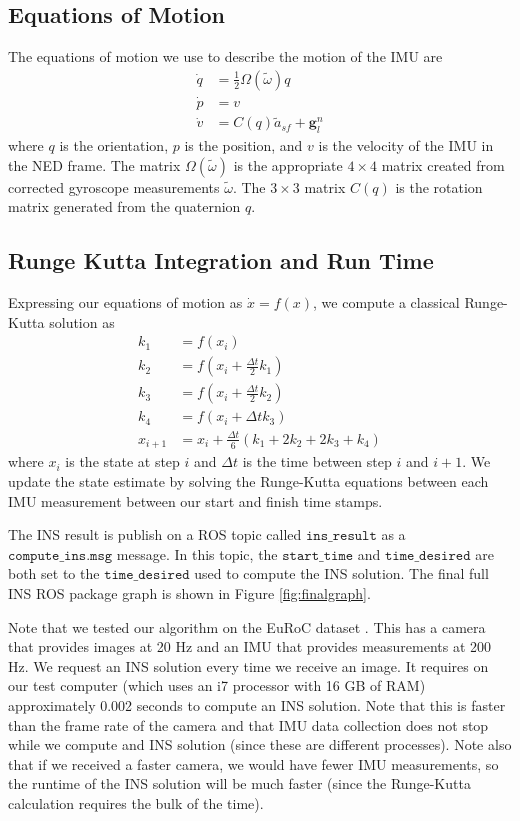 \documentclass[11pt,a4paper]{article}
\begin{document}
\subsection{Equations of Motion}
The equations of motion we use to describe the motion of the IMU are
\begin{align}
	\dot{q} & = \frac{1}{2}\Omega(\tilde{\omega}) q \\
	\dot{p} & = v \\
	\dot{v} & = C(q)\tilde{a}_{sf} + \mathbf{g}^n_l
\end{align}
where $q$ is the orientation, $p$ is the position, and $v$ is the velocity of the IMU in the NED frame. The matrix $\Omega(\tilde{\omega})$ is the appropriate $4\times 4$ matrix created from corrected gyroscope measurements $\tilde{\omega}$. The $3 \times 3$ matrix $C(q)$ is the rotation matrix generated from the quaternion $q$.

\subsection{Runge Kutta Integration and Run Time}
Expressing our equations of motion as $\dot{x} = f(x)$, we compute a classical Runge-Kutta solution as
\begin{align}
	k_1 & = f(x_i) \\
	k_2 & = f(x_i + \frac{\Delta t}{2}k_1) \\
	k_3 & = f(x_i + \frac{\Delta t}{2}k_2) \\
	k_4 & = f(x_i + \Delta t k_3) \\
	x_{i+1} & = x_i + \frac{\Delta t}{6}\left(k_1 + 2 k_2 + 2 k_3 + k_4\right) 
\end{align}
where $x_i$ is the state at step $i$ and $\Delta t$ is the time between step $i$ and $i+1$. We update the state estimate by solving the Runge-Kutta equations between each IMU measurement between our start and finish time stamps.

The INS result is publish on a ROS topic called $\texttt{ins\_result}$ as a $\texttt{compute\_ins.msg}$ message. In this topic, the $\texttt{start\_time}$ and $\texttt{time\_desired}$ are both set to the $\texttt{time\_desired}$ used to compute the INS solution. The final full INS ROS package graph is shown in Figure \ref{fig:finalgraph}.

Note that we tested our algorithm on the EuRoC dataset \cite{Burri:2016}. This has a camera that provides images at 20 Hz and an IMU that provides measurements at 200 Hz. We request an INS solution every time we receive an image. It requires on our test computer (which uses an i7 processor with 16 GB of RAM) approximately 0.002 seconds to compute an INS solution. Note that this is faster than the frame rate of the camera and that IMU data collection does not stop while we compute and INS solution (since these are different processes). Note also that if we received a faster camera, we would have fewer IMU measurements, so the runtime of the INS solution will be much faster (since the Runge-Kutta calculation requires the bulk of the time).
\end{document}
